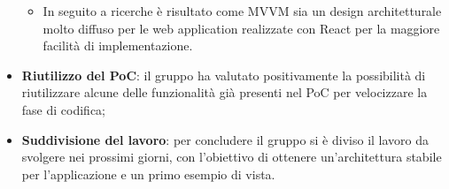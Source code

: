 \begin{itemize}
\begin{itemize}
\begin{itemize}
		\end{itemize} 
		\item In seguito a ricerche è risultato come MVVM sia un design architetturale molto diffuso per le web application realizzate con React per la maggiore facilità di implementazione.
	\end{itemize}
	\item \textbf{Riutilizzo del PoC}: il gruppo ha valutato positivamente la possibilità di riutilizzare alcune delle funzionalità già presenti nel PoC per velocizzare la fase di codifica;  
	\item \textbf{Suddivisione del lavoro}: per concludere il gruppo si è diviso il lavoro da svolgere nei prossimi giorni, con l'obiettivo di ottenere un'architettura stabile per l'applicazione e un primo esempio di vista.
\end{itemize}


